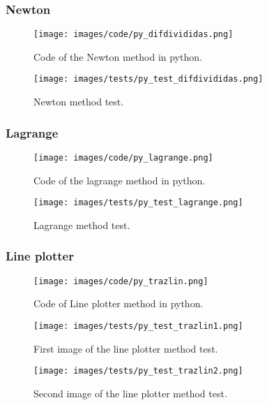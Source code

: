 \documentclass{article}
\begin{document}
\subsubsection{Newton}
\begin{figure}[ht]
\centering
\texttt{[image: images/code/py\_difdivididas.png]}
\caption{\label{fig:py_gausstot}Code of the Newton method in python.}
\end{figure}
\FloatBarrier
\begin{figure}[ht]
\centering
\texttt{[image: images/tests/py\_test\_difdivididas.png]}
\caption{\label{fig:py_gausstot}Newton method test.}
\end{figure}
\FloatBarrier

\subsubsection{Lagrange}
\begin{figure}[ht]
\centering
\texttt{[image: images/code/py\_lagrange.png]}
\caption{\label{fig:py_gausspar}Code of the lagrange method in python.}
\end{figure}
\FloatBarrier
\begin{figure}[ht]
\centering
\texttt{[image: images/tests/py\_test\_lagrange.png]}
\caption{\label{fig:py_gausspar}Lagrange method test.}
\end{figure}
\FloatBarrier

\subsubsection{Line plotter}
\begin{figure}[ht]
\centering
\texttt{[image: images/code/py\_trazlin.png]}
\caption{\label{fig:py_gausspar}Code of Line plotter method in python.}
\end{figure}
\FloatBarrier
\begin{figure}[ht]
\centering
\texttt{[image: images/tests/py\_test\_trazlin1.png]}
\caption{\label{fig:py_gausspar}First image of the line plotter method test.}
\end{figure}
\FloatBarrier
\FloatBarrier
\begin{figure}[ht]
\centering
\texttt{[image: images/tests/py\_test\_trazlin2.png]}
\caption{\label{fig:py_gausspar}Second image of the line plotter method test.}
\end{figure}
\FloatBarrier
\end{document}
